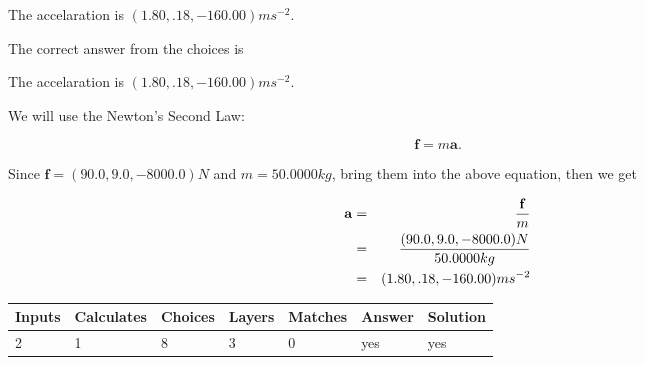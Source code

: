 \documentclass[12pt]{article}
\begin{document}
 
The accelaration is $  %
(
1.80,
.18,
-160.00)
ms^{-2} $.
 
 
\noindent{}
 
 
 
 
 
\noindent{}
 
 

The correct answer from the choices is


The accelaration is $  %
(
1.80,
.18,
-160.00)
ms^{-2} $.
 
 
 
\noindent{}
 
 

 
 
 
\noindent{}
 
 

We will use the Newton's Second Law:
 
\[
\mathbf{f}=m\mathbf{a}.
\]
 
Since $\mathbf{f}= %
(90.0 , 9.0 , -8000.0) N$
and $m= %
50.0000kg$, bring them into the above equation, then we get
 
\begin{eqnarray*}
\mathbf{a}&=&\frac{\mathbf{f}}m  \\
&=&\frac{ %
(90.0 , 9.0 , -8000.0) N}{ %
50.0000kg}  \\
&=& %
(1.80 , .18 , -160.00) ms^{-2}
\end{eqnarray*}
 
 
 
\noindent{}
 
 

 
\vspace{0.3in}
   
   
   
   
\noindent\begin{tabular}{|l|l|l|l|l|l|l|}
 \hline
Inputs & Calculates & Choices & Layers & Matches & Answer & Solution \\ \hline
           2 & 
           1 & 
           8
  & 
           3 & 
           0 & 
  yes & 
  yes 
  \\ \hline
 \end{tabular}
   
\end{document}
